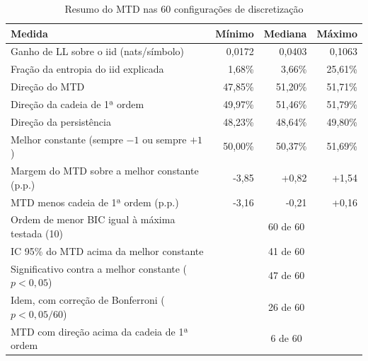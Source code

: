 \begin{table}[htb]
  \centering
  \caption{Resumo do MTD nas 60 configurações de discretização}
  \label{tab:mtd_resumo}
  \small
  \begin{tabular}{lrrr}
    \toprule
    Medida & Mínimo & Mediana & Máximo \\
    \midrule
    Ganho de LL sobre o iid (nats/símbolo) & 0,0172 & 0,0403 & 0,1063 \\
    Fração da entropia do iid explicada & 1,68\% & 3,66\% & 25,61\% \\
    \midrule
    Direção do MTD & 47,85\% & 51,20\% & 51,71\% \\
    Direção da cadeia de 1ª ordem & 49,97\% & 51,46\% & 51,79\% \\
    Direção da persistência & 48,23\% & 48,64\% & 49,80\% \\
    Melhor constante (sempre $-1$ ou sempre $+1$) & 50,00\% & 50,37\% & 51,69\% \\
    Margem do MTD sobre a melhor constante (p.p.) & -3,85 & +0,82 & +1,54 \\
    MTD menos cadeia de 1ª ordem (p.p.) & -3,16 & -0,21 & +0,16 \\
    \midrule
    Ordem de menor BIC igual à máxima testada (10) & \multicolumn{3}{c}{60 de 60} \\
    IC 95\% do MTD acima da melhor constante & \multicolumn{3}{c}{41 de 60} \\
    Significativo contra a melhor constante ($p<0{,}05$) & \multicolumn{3}{c}{47 de 60} \\
    Idem, com correção de Bonferroni ($p<0{,}05/60$) & \multicolumn{3}{c}{26 de 60} \\
    MTD com direção acima da cadeia de 1ª ordem & \multicolumn{3}{c}{6 de 60} \\
    \bottomrule
  \end{tabular}
\end{table}

